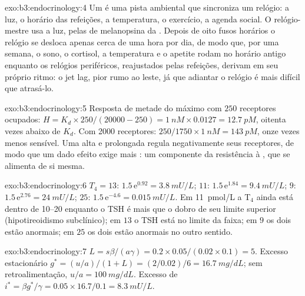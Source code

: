 \begin{solution}{exo:b3:endocrinology:4}
Um  é uma pista ambiental que sincroniza um relógio: a luz, o
horário das refeições, a temperatura, o exercício, a agenda social. O
relógio-mestre usa a luz, pelas  de melanopsina da
. Depois de oito fusos horários o relógio se desloca apenas cerca
de uma hora por dia, de modo que, por uma semana, o sono, o cortisol, a
temperatura e o apetite rodam no horário antigo enquanto os relógios
periféricos, reajustados pelas refeições, derivam em seu próprio ritmo:
o jet lag, pior rumo ao leste, já que adiantar o relógio é mais difícil
que atrasá-lo.
\end{solution}

\begin{solution}{exo:b3:endocrinology:5}
Resposta de metade do máximo com $250$ receptores ocupados: $H = K_{d}\times
250/(\num{20000} - 250) = \qty{1}{nM}\times 0.0127 = \qty{12.7}{pM}$, oitenta vezes abaixo de $K_{d}$. Com \num{2000}
receptores: $250/1750
\times \qty{1}{nM} = \qty{143}{pM}$, onze vezes
menos sensível. Uma  alta e prolongada regula negativamente seus
receptores, de modo que um dado efeito exige mais : um
componente da resistência à , que se alimenta de si mesma.
\end{solution}

\begin{solution}{exo:b3:endocrinology:6}
$T_{4} = 13$: $1.5\,\mathrm{e}^{0.92} = \qty{3.8}{mU/L}$; $11$:
$1.5\,\mathrm{e}^{1.84} = \qty{9.4}{mU/L}$; $9$: $1.5\,\mathrm{e}^{2.76}
= \qty{24}{mU/L}$; $25$: $1.5\,\mathrm{e}^{-4.6} = \qty{0.015}{mU/L}$. Em
\qty{11}{pmol/L} a T$_{4}$ ainda está dentro de \qtyrange{10}{20}{}
enquanto o TSH é mais que o dobro de seu limite superior (hipotireoidismo
subclínico); em $13$ o TSH está no limite da faixa; em $9$ os dois estão
anormais; em $25$ os dois estão anormais no outro sentido.
\end{solution}

\begin{solution}{exo:b3:endocrinology:7}
$L = s\beta/(a\gamma) = 0.2\times 0.05/(0.02\times 0.1) = 5$. Excesso
estacionário $g^{*} = (u/a)/(1 + L) = (2/0.02)/6 = \qty{16.7}{mg/dL}$;
sem retroalimentação, $u/a = \qty{100}{mg/dL}$. Excesso de 
$i^{*} = \beta g^{*}/
\gamma = 0.05\times 16.7/0.1 = \qty{8.3}{mU/L}$.
\end{solution}

